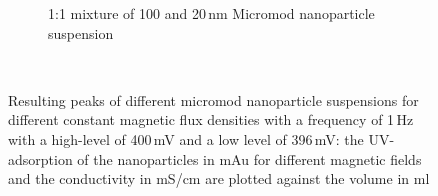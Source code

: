 \begin{figure}[H]
        	\centering
            \begin{subfigure}{0.49\textwidth}
                  \flushleft
                  \caption{1:1 mixture of 100 and 20\,nm Micromod nanoparticle suspension}\label{subfig:micromod_mix_peak}
          \end{subfigure}\hfill
          \\
        \caption[Resulting peaks of different micromod nanoparticle suspensions for different constant magnetic flux densities]{Resulting peaks of different micromod nanoparticle suspensions for different constant magnetic flux densities with a frequency of 1\,Hz with a high-level of 400\,mV and a low level of 396\,mV: the UV-adsorption of the nanoparticles in mAu for different magnetic fields and the conductivity in mS/cm are plotted against the volume in ml}
        \label{fig:micromod_peaks}
  \end{figure}

